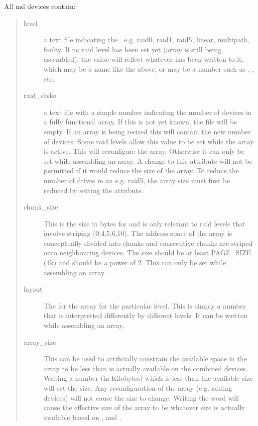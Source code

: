 \documentclass[a4paper,8pt,english]{sphinxmanual}
\begin{document}
All md devices contain:
\begin{quote}
\begin{description}
\item[{level}] \leavevmode
a text file indicating the . e.g. raid0, raid1,
raid5, linear, multipath, faulty.
If no raid level has been set yet (array is still being
assembled), the value will reflect whatever has been written
to it, which may be a name like the above, or may be a number
such as , , etc.

\item[{raid\_disks}] \leavevmode
a text file with a simple number indicating the number of devices
in a fully functional array.  If this is not yet known, the file
will be empty.  If an array is being resized this will contain
the new number of devices.
Some raid levels allow this value to be set while the array is
active.  This will reconfigure the array.   Otherwise it can only
be set while assembling an array.
A change to this attribute will not be permitted if it would
reduce the size of the array.  To reduce the number of drives
in an e.g. raid5, the array size must first be reduced by
setting the  attribute.

\item[{chunk\_size}] \leavevmode
This is the size in bytes for  and is only relevant to
raid levels that involve striping (0,4,5,6,10). The address space
of the array is conceptually divided into chunks and consecutive
chunks are striped onto neighbouring devices.
The size should be at least PAGE\_SIZE (4k) and should be a power
of 2.  This can only be set while assembling an array

\item[{layout}] \leavevmode
The  for the array for the particular level.  This is
simply a number that is interpretted differently by different
levels.  It can be written while assembling an array.

\item[{array\_size}] \leavevmode
This can be used to artificially constrain the available space in
the array to be less than is actually available on the combined
devices.  Writing a number (in Kilobytes) which is less than
the available size will set the size.  Any reconfiguration of the
array (e.g. adding devices) will not cause the size to change.
Writing the word  will cause the effective size of the
array to be whatever size is actually available based on
,  and .


\end{description}
\end{quote}
\end{document}
